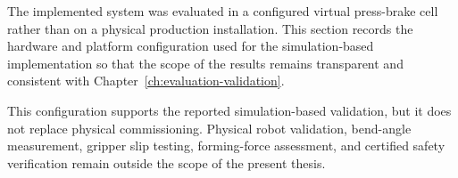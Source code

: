The implemented system was evaluated in a configured virtual press-brake cell
rather than on a physical production installation. This section records the
hardware and platform configuration used for the simulation-based
implementation so that the scope of the results remains transparent and
consistent with Chapter~\ref{ch:evaluation-validation}.



This configuration supports the reported simulation-based validation, but it
does not replace physical commissioning. Physical robot validation, bend-angle
measurement, gripper slip testing, forming-force assessment, and certified
safety verification remain outside the scope of the present thesis.

